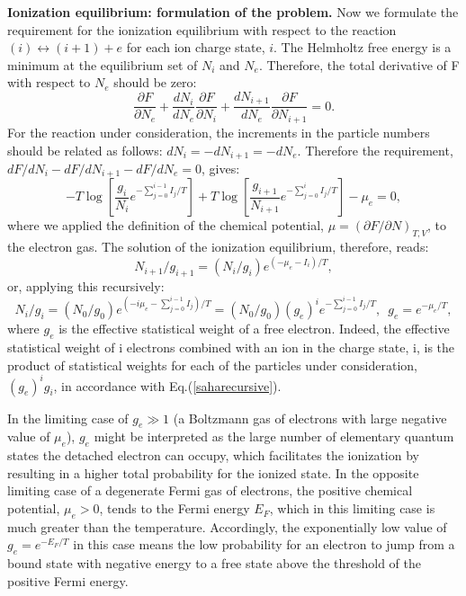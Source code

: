 {\bf Ionization equilibrium: formulation of the problem.} Now we formulate the requirement for the
ionization equilibrium with respect to the reaction $(i)\leftrightarrow(i+1)+e$ for each ion charge state, $i$.
The Helmholtz free energy is a minimum at the equilibrium set of $N_i$ and $N_e$. Therefore, the total
derivative of F with respect to $N_e$ should be zero:
\begin{equation}
\frac{\partial F}{\partial N_e} + \frac{d N_i}{d N_e} \frac{\partial F}{\partial N_i} +
\frac{d N_{i+1}}{d N_e} \frac{\partial F}{\partial N_{i+1}} = 0.
\end{equation}
For the reaction under
consideration, the increments in the particle numbers should be 
related as follows: $dN_{i}=-dN_{i+1}=-dN_e$.
Therefore the requirement, $dF/dN_{i}-dF/dN_{i+1}-dF/dN_e=0$, gives:
\begin{equation}\label{equili}
-T\log\left[\frac{g_{i}}{N_{i}} e^{-\sum_{j=0}^{i-1}I_j/T}\right] + T\log\left[\frac{g_{i+1}}{N_{i+1}} e^{-\sum_{j=0}^{i}I_j/T}\right]-\mu_e=0,
\end{equation}
where we applied the definition of the chemical potential, $\mu=(\partial F/\partial N)_{T,V}$, to the electron gas.
The solution of the ionization equilibrium, therefore, reads:
\begin{equation}
N_{i+1}/g_{i+1}=(N_i/g_i)e^{(-\mu_e-I_i)/T},
\end{equation}
or, applying this recursively:
\begin{equation}\label{saharecursive}
N_{i}/g_{i}=(N_0/g_0)e^{(-i\mu_e-\sum_{j=0}^{i-1}I_j)/T}=(N_0/g_0)(g_e)^ie^{-\sum_{j=0}^{i-1}I_j/T},\,\,\,g_e=e^{-\mu_e/T},
\end{equation}
where $g_e$ is the effective statistical weight of a free electron.
Indeed, the effective statistical weight of i electrons combined with an ion in the charge state, i, is the
product of statistical weights for each of the particles under consideration, $(g_e)^i g_i$, in accordance with Eq.(\ref{saharecursive}).

In the limiting case of $g_e\gg1$ 
(a Boltzmann gas of electrons with large negative value of $\mu_e$), $g_e$ might be interpreted as the
large number of elementary quantum states the detached electron can occupy, which facilitates the ionization by resulting in a higher total probability for 
the ionized state. In the opposite limiting case of a degenerate Fermi gas of electrons, the positive chemical potential, $\mu_e>0$, 
tends to the Fermi energy $E_F$, which in
this limiting case is much greater than the temperature. Accordingly, the exponentially low value of $g_e=e^{-E_F/T}$ in this case means the low 
probability for an electron to jump from a bound state with negative energy to a free state above the threshold of the positive Fermi energy.  

